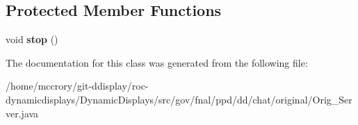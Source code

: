 \subsection*{Protected Member Functions}
\begin{DoxyCompactItemize}
\item 
\hypertarget{classgov_1_1fnal_1_1ppd_1_1dd_1_1chat_1_1original_1_1Orig__Server_ada2eb5e96b41a212ff71d282b6a947ce}{void {\bfseries stop} ()}\label{classgov_1_1fnal_1_1ppd_1_1dd_1_1chat_1_1original_1_1Orig__Server_ada2eb5e96b41a212ff71d282b6a947ce}

\end{DoxyCompactItemize}


The documentation for this class was generated from the following file\-:\begin{DoxyCompactItemize}
\item 
/home/mccrory/git-\/ddisplay/roc-\/dynamicdisplays/\-Dynamic\-Displays/src/gov/fnal/ppd/dd/chat/original/Orig\-\_\-\-Server.\-java\end{DoxyCompactItemize}
